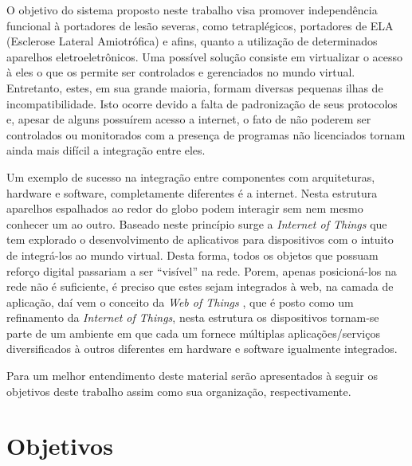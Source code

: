 \documentclass[12pt,a4paper,oneside]{report}
\begin{document}
O objetivo do sistema proposto neste trabalho visa promover independência funcional à portadores de lesão severas, como tetraplégicos, portadores de ELA (Esclerose Lateral Amiotrófica) e afins, quanto a utilização de determinados aparelhos eletroeletrônicos. Uma possível solução consiste em virtualizar o acesso à eles o que os permite ser controlados e gerenciados no mundo virtual. Entretanto, estes, em sua grande maioria, formam diversas pequenas ilhas de incompatibilidade. Isto ocorre devido a falta de padronização de seus protocolos e, apesar de alguns possuírem acesso a internet, o fato de não poderem ser controlados ou monitorados com a presença de programas não licenciados tornam ainda mais difícil a integração entre eles.

Um exemplo de sucesso na integração entre componentes com arquiteturas, hardware e software, completamente diferentes é a internet. Nesta estrutura aparelhos espalhados ao redor do globo podem interagir sem nem mesmo conhecer um ao outro. Baseado neste princípio surge a \emph{Internet of Things}\cite{IoT} que tem explorado o desenvolvimento de aplicativos para dispositivos com o intuito de integrá-los ao mundo virtual. Desta forma, todos os objetos que possuam reforço digital passariam a ser ``visível'' na rede. Porem, apenas posicioná-los na rede não é suficiente, é preciso que estes sejam integrados à web, na camada de aplicação, daí vem o conceito da \emph{Web of Things} \cite{wotdovad}, que é posto como um refinamento da \emph{Internet of Things}, nesta estrutura os dispositivos tornam-se parte de um ambiente em que cada um fornece múltiplas aplicações/serviços diversificados à outros diferentes em hardware e software igualmente integrados.

Para um melhor entendimento deste material serão apresentados à seguir os objetivos deste trabalho assim como sua organização, respectivamente.

\section{Objetivos}
\end{document}
